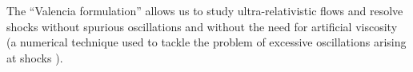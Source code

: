 %
The ``Valencia formulation'' allows us to study ultra-relativistic flows and resolve shocks without
spurious oscillations and without the need for artificial viscosity (a numerical technique used to 
tackle the problem of excessive oscillations arising at shocks \citep[\eg][]{Font:2008fka}).
%

%
%
%
%
